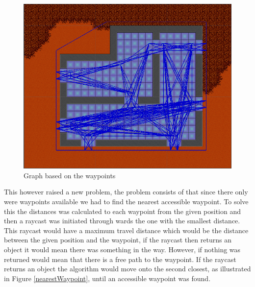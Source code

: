 \begin{figure}[H]
	\includegraphics[width=\textwidth]{figures/astar/waypointsGraph}
	\caption{Graph based on the waypoints}
	\label{waypointgraph}
\end{figure}
This however raised a new problem, the problem consists of that since there only were waypoints available we had to find the nearest accessible waypoint.
To solve this the distances was calculated to each waypoint from the given position and then a raycast was initiated through wards the one with the smallest distance.
This raycast would have a maximum travel distance which would be the distance between the given position and the waypoint, if the raycast then returns an object it would mean there was something in the way. However, if nothing was returned would mean that there is a free path to the waypoint.
If the raycast returns an object the algorithm would move onto the second closest, as illustrated in Figure \ref{nearestWaypoint}, until an accessible waypoint was found.
